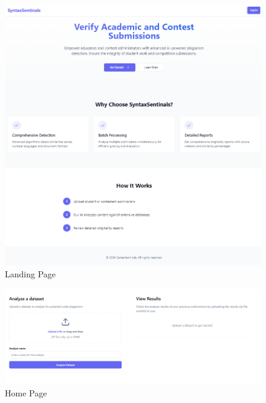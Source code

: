 \documentclass[12pt, titlepage]{article}
\begin{document}
\begin{figure}[H]
  \centering
  \includegraphics[width=\textwidth]{Landing.png}
  \caption{Landing Page}
  \label{fig:landing}
\end{figure}

\begin{figure}[H]
  \centering
  \includegraphics[width=\textwidth]{home.png}
  \caption{Home Page}
  \label{fig:home}
\end{figure}
\end{document}
